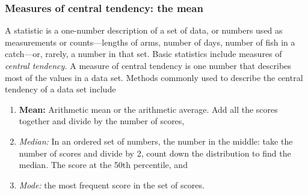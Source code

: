 \documentclass[12pt]{exam}
\newcommand*\AnswerBox[2]{%
    \parbox[t][#1]{0.92\textwidth}{%
    \begin{solution}#2\end{solution}}
}
\begin{document}
\subsubsection*{Measures of central tendency: the mean}

A statistic is a one-number description of a set of data, or numbers
used as measurements or counts—lengths of arms, number of days, number
of fish in a catch—or, rarely, a number in that set. Basic statistics 
include measures of \emph{central tendency.} A measure of central tendency 
is one number that describes most of the values in a data set. Methods 
 commonly used to describe the central tendency of a data set include 

\begin{enumerate}

	\item \textbf{Mean:} Arithmetic mean or the
arithmetic average. Add all the scores together and divide by the number
of scores,

	\item \emph{Median:} In an ordered set of numbers, the number in the middle:
take the number of scores and divide by 2, count down the distribution
to find the median. The score at the 50th percentile, and

	\item \emph{Mode:} the most frequent score in the set of
scores.

\end{enumerate}



%
%
% 
% 
%
\end{document}
